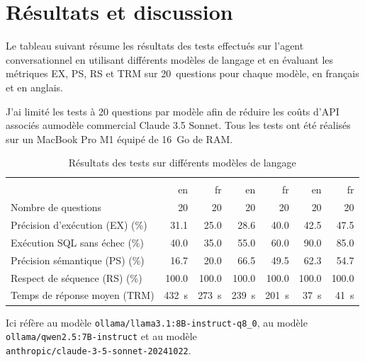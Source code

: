 \documentclass[a4paper,11pt]{article}
\begin{document}
\section{Résultats et discussion}
\label{sec:results}

Le tableau suivant résume les résultats des tests effectués sur l'agent conversationnel en utilisant différents modèles de langage et en évaluant les métriques EX, PS, RS et TRM
sur 20~questions pour chaque modèle, en français et en anglais.

J'ai limité les tests à 20 questions par modèle afin de réduire les coûts d'API associés aumodèle commercial Claude 3.5 Sonnet. Tous les tests ont été réalisés sur un MacBook Pro M1 équipé de 16~Go de RAM.


\begin{table}[h!]
\small
\centering
\begin{tabular}{l|r r|r r|r r}
\toprule
&  &  
&  \\
& {en} & {fr} & {en} & {fr} & {en} & {fr} \\
\midrule
Nombre de questions & 20 & 20 & 20 & 20 & 20 & 20 \\
Précision d'exécution (EX) (\%) & 31.1 & 25.0 & 28.6 & 40.0 & 42.5 & 47.5 \\
Exécution SQL sans échec (\%) & 40.0 & 35.0 & 55.0 & 60.0 & 90.0 & 85.0 \\
Précision sémantique (PS) (\%) & 16.7 & 20.0 & 66.5 & 49.5 & 62.3 & 54.7 \\
Respect de séquence (RS) (\%) & 100.0 & 100.0 & 100.0 & 100.0 & 100.0 & 100.0 \\
Temps de réponse moyen (TRM) & 432~s & 273~s & 239~s & 201~s & 37~s & 41~s \\
\bottomrule
\end{tabular}
\caption{Résultats des tests sur différents modèles de langage}
\label{tab:resultats}
\end{table}

\newpage
Ici  réfère au modèle \texttt{ollama/llama3.1:8B-instruct-q8\_0}, 
 au modèle \texttt{ollama/qwen2.5:7B-instruct} et 
 au modèle \\
\texttt{anthropic/claude-3-5-sonnet-20241022}.
\end{document}
